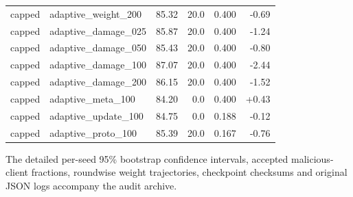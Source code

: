 \begin{table}[t]
\begin{tabular}{llrrrr}
capped & adaptive\_weight\_200 & 85.32 & 20.0 & 0.400 & -0.69\\
capped & adaptive\_damage\_025 & 85.87 & 20.0 & 0.400 & -1.24\\
capped & adaptive\_damage\_050 & 85.43 & 20.0 & 0.400 & -0.80\\
capped & adaptive\_damage\_100 & 87.07 & 20.0 & 0.400 & -2.44\\
capped & adaptive\_damage\_200 & 86.15 & 20.0 & 0.400 & -1.52\\
capped & adaptive\_meta\_100 & 84.20 & 0.0 & 0.400 & +0.43\\
capped & adaptive\_update\_100 & 84.75 & 0.0 & 0.188 & -0.12\\
capped & adaptive\_proto\_100 & 85.39 & 20.0 & 0.167 & -0.76\\
\hline
\end{tabular}
\vspace{1mm}
\parbox{0.96\textwidth}{\footnotesize The detailed per-seed 95\% bootstrap confidence intervals, accepted malicious-client fractions, roundwise weight trajectories, checkpoint checksums and original JSON logs accompany the audit archive.}
\end{table}
